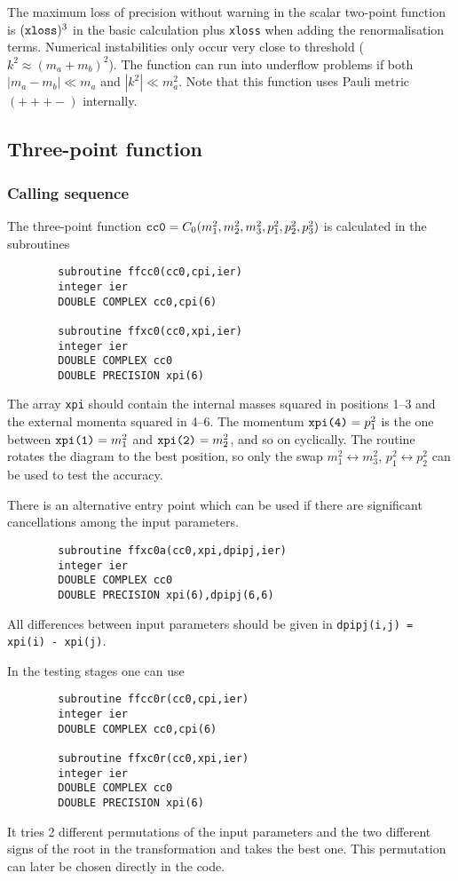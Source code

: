 The maximum loss of precision without warning in the scalar two-point function 
is $(\mbox{\tt xloss})^3$ in the basic calculation plus {\tt xloss} when adding 
the renormalisation terms.  Numerical instabilities only occur very close to 
threshold ($k^2 \approx (m_a + m_b)^2$).  The function can run into underflow 
problems if both $|m_a-m_b| \ll m_a$ and $|k^2| \ll m_a^2$.  Note that this 
function uses Pauli metric {\small $(+++-)$} internally.

\subsection{Three-point function}

\subsubsection{Calling sequence}

The three-point function $\mbox{\tt cc0} = C_0(m_1^2,m_2^2,m_3^2,p_1^2, 
p_2^2,p_3^2)$ is calculated in the subroutines
\begin{verbatim}
        subroutine ffcc0(cc0,cpi,ier)
        integer ier
        DOUBLE COMPLEX cc0,cpi(6)

        subroutine ffxc0(cc0,xpi,ier)
        integer ier
        DOUBLE COMPLEX cc0
        DOUBLE PRECISION xpi(6)
\end{verbatim}
The array {\tt xpi} should contain the internal masses squared in positions 
1--3 and the external momenta squared in 4--6.  The momentum $\mbox{\tt xpi(4)} = 
p_1^2$ is the one between $\mbox{\tt xpi(1)} = m_1^2$ and $\mbox{\tt xpi(2)} = 
m_2^2$, and so on cyclically.  The routine rotates the diagram to the best 
position, so only the swap $m_1^2 \leftrightarrow m_3^2$, $p_1^2 
\leftrightarrow p_2^2$ can be used to test the accuracy.  

There is an alternative entry point which can be used if there 
are significant cancellations among the input parameters.
\begin{verbatim}
        subroutine ffxc0a(cc0,xpi,dpipj,ier)
        integer ier
        DOUBLE COMPLEX cc0
        DOUBLE PRECISION xpi(6),dpipj(6,6)
\end{verbatim}
All differences between input parameters should be given in 
{\tt dpipj(i,j) = xpi(i) - xpi(j)}.

In the testing stages one can use
\begin{verbatim}
        subroutine ffcc0r(cc0,cpi,ier)
        integer ier
        DOUBLE COMPLEX cc0,cpi(6)

        subroutine ffxc0r(cc0,xpi,ier)
        integer ier
        DOUBLE COMPLEX cc0
        DOUBLE PRECISION xpi(6)
\end{verbatim}
It tries 2 different permutations of the input parameters and the two 
different signs of the root in the transformation and takes the best one.  
This permutation can later be chosen directly in the code.

